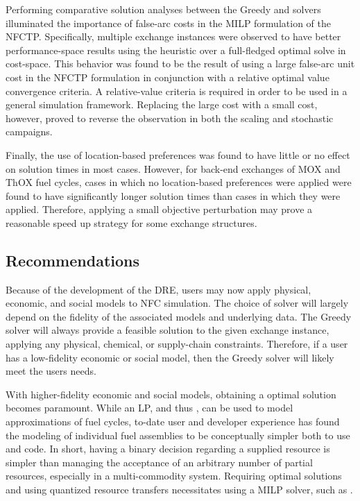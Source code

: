 Performing comparative solution analyses between the Greedy and \cbc solvers
illuminated the importance of false-arc costs in the MILP formulation of the
NFCTP. Specifically, multiple exchange instances were observed to have better
performance-space results using the heuristic over a full-fledged optimal solve
in cost-space. This behavior was found to be the result of using a large
false-arc unit cost in the NFCTP formulation in conjunction with a relative
optimal value convergence criteria. A relative-value criteria is required in
order to be used in a general simulation framework. Replacing the large cost
with a small cost, however, proved to reverse the observation in both the
scaling and stochastic campaigns. 

Finally, the use of location-based preferences was found to have little or no
effect on \cbc solution times in most cases. However, for back-end exchanges of
MOX and ThOX fuel cycles, cases in which no location-based preferences were
applied were found to have significantly longer solution times than cases in
which they were applied. Therefore, applying a small objective perturbation may
prove a reasonable speed up strategy for some exchange structures.

\subsection{Recommendations}

Because of the development of the DRE, users may now apply physical, economic,
and social models to NFC simulation. The choice of solver will largely depend on
the fidelity of the associated models and underlying data. The Greedy solver
will always provide a feasible solution to the given exchange instance, applying
any physical, chemical, or supply-chain constraints. Therefore, if a user has a
low-fidelity economic or social model, then the Greedy solver will likely meet
the users needs.

With higher-fidelity economic and social models, obtaining a optimal solution
becomes paramount. While an LP, and thus \clp, can be used to model
approximations of fuel cycles, to-date user and developer experience has found
the modeling of individual fuel assemblies to be conceptually simpler both to
use and code. In short, having a binary decision regarding a supplied resource
is simpler than managing the acceptance of an arbitrary number of partial
resources, especially in a multi-commodity system. Requiring optimal solutions
and using quantized resource transfers necessitates using a MILP solver, such as
\cbc.

